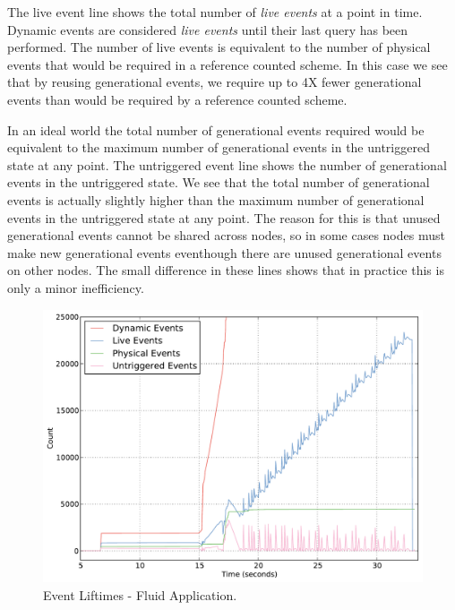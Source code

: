 The live event line shows the total number of {\em live events} at a point in time.  Dynamic events
are considered {\em live events} until their last query has been performed.  The number of live
events is equivalent to the number of physical events that would be required
in a reference counted scheme.  In this case we see that by reusing
generational events, we require up to 4X fewer generational events than would be
required by a reference counted scheme.

In an ideal world the total number of generational events required would be
equivalent to the maximum number of generational events in the untriggered
state at any point.  The untriggered event line shows the number of generational
events in the untriggered state.  We see that the total number of generational
events is actually slightly higher than the maximum number of generational
events in the untriggered state at any point.  The reason for this is that unused
generational events cannot be shared across nodes, so in some cases nodes must
make new generational events eventhough there are unused generational events
on other nodes.  The small difference in these lines shows that in practice
this is only a minor inefficiency.

\begin{figure}
\begin{center}
\includegraphics[scale=0.33]{figs/event_lifetimes.pdf}
\end{center}
\vspace{-6mm}
\caption{Event Liftimes - Fluid Application.\label{fig:eventlife}}
\vspace{-4mm}
\end{figure}

